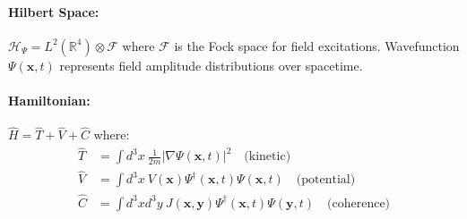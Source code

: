 \documentclass{article}
\begin{document}
\paragraph{Hilbert Space:}
$\mathcal{H}_{\Psi} = L^2(\mathbb{R}^4) \otimes \mathcal{F}$ where $\mathcal{F}$ is the Fock space for field excitations. Wavefunction $\Psi(\mathbf{x},t)$ represents field amplitude distributions over spacetime.


\paragraph{Hamiltonian:}
$\hat{H} = \hat{T} + \hat{V} + \hat{C}$ where:
\begin{align}
\hat{T} &= \int d^3x \: \frac{1}{2m}|\nabla\Psi(\mathbf{x},t)|^2 \quad \text{(kinetic)} \\
\hat{V} &= \int d^3x \: V(\mathbf{x})\Psi^{\dagger}(\mathbf{x},t)\Psi(\mathbf{x},t) \quad \text{(potential)} \\
\hat{C} &= \int d^3x d^3y \: J(\mathbf{x},\mathbf{y})\Psi^{\dagger}(\mathbf{x},t)\Psi(\mathbf{y},t) \quad \text{(coherence)}
\end{align}
\end{document}
